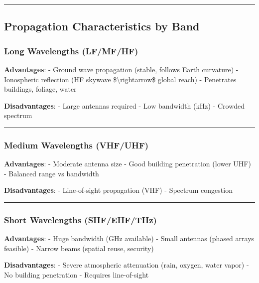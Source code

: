 \begin{center}\rule{0.5\linewidth}{0.5pt}\end{center}

\subsection{Propagation Characteristics by
Band}\label{propagation-characteristics-by-band}

\subsubsection{Long Wavelengths
(LF/MF/HF)}\label{long-wavelengths-lfmfhf}

\textbf{Advantages}: - Ground wave propagation (stable, follows Earth
curvature) - Ionospheric reflection (HF skywave
\$\textbackslash rightarrow\$ global reach) - Penetrates buildings,
foliage, water

\textbf{Disadvantages}: - Large antennas required - Low bandwidth (kHz)
- Crowded spectrum

\begin{center}\rule{0.5\linewidth}{0.5pt}\end{center}

\subsubsection{Medium Wavelengths
(VHF/UHF)}\label{medium-wavelengths-vhfuhf}

\textbf{Advantages}: - Moderate antenna size - Good building penetration
(lower UHF) - Balanced range vs bandwidth

\textbf{Disadvantages}: - Line-of-sight propagation (VHF) - Spectrum
congestion

\begin{center}\rule{0.5\linewidth}{0.5pt}\end{center}

\subsubsection{Short Wavelengths
(SHF/EHF/THz)}\label{short-wavelengths-shfehfthz}

\textbf{Advantages}: - Huge bandwidth (GHz available) - Small antennas
(phased arrays feasible) - Narrow beams (spatial reuse, security)

\textbf{Disadvantages}: - Severe atmospheric attenuation (rain, oxygen,
water vapor) - No building penetration - Requires line-of-sight

